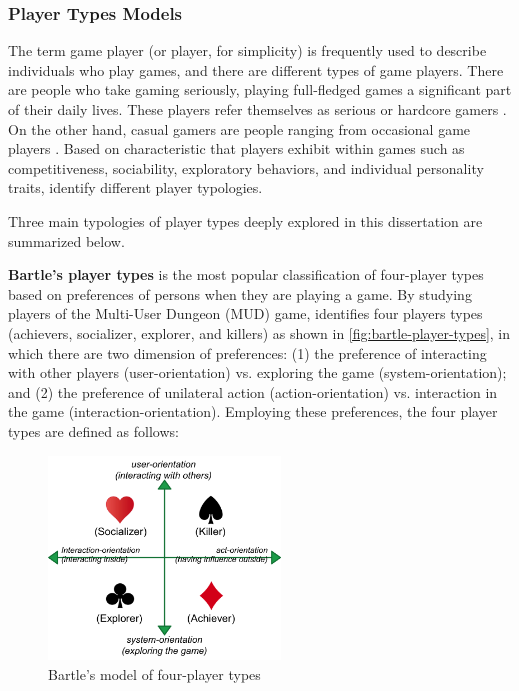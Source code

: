 \subsubsection{Player Types Models}
\label{subsec:player-types}

The term game player (or player, for simplicity) is frequently used to describe individuals who play games, and there are different types of game players. There are people who take gaming seriously, playing full-fledged games a significant part of their daily lives. These players refer themselves as serious or hardcore gamers \cite{BosserNakatsu2006}. On the other hand, casual gamers are people ranging from occasional game players \cite{KuittinenKultimaNiemelaPaavilainen2007}. Based on characteristic that players exhibit within games such as competitiveness, sociability, exploratory behaviors, and individual personality traits, \cite{LawsJackson2002, NackeBatemanMandryk2014, Bartle2004, Marczewski2013} identify different player typologies. 

Three main typologies of player types deeply explored in this dissertation are summarized below.

\textbf{Bartle's player types} \cite{Bartle2004, Bartle1996} is the most popular classification of four-player types based on preferences of persons when they are playing a game.
By studying players of the Multi-User Dungeon (MUD) game,  identifies four players types (achievers, socializer, explorer, and killers) as shown in \autoref{fig:bartle-player-types}, in which there are two dimension of preferences: (1) the preference of interacting with other players (user-orientation) vs. exploring the game (system-orientation); and (2) the preference of unilateral action (action-orientation) vs. interaction in the game (interaction-orientation).
Employing these preferences, the four player types are defined as follows:

\begin{figure}[htb]
 \caption{Bartle's model of four-player types}
 \label{fig:bartle-player-types}
 \centering
 \includegraphics[width=0.55\textwidth]{images/chap-general-background/bartle-player-types.png}
\end{figure}

